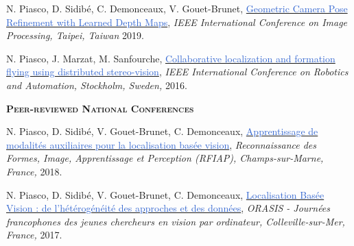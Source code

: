 \documentclass[]{friggeri-cv-cust}
\begin{document}
    {\footnotesize{N. Piasco, D. Sidibé,  C. Demonceaux, V. Gouet-Brunet, \href{}{\textcolor{highlight}{Geometric Camera Pose Refinement with Learned Depth Maps}},
\textit{IEEE International Conference on Image Processing, Taipei, Taiwan} 2019.}}

	{\footnotesize{N. Piasco, J. Marzat, M. Sanfourche, \href{http://julien.marzat.free.fr/Publications/2016\%20ICRA/2016_ICRA_Collaborative_localization_formation_flying_distributed_stereo-vision.pdf}{\textcolor{highlight}{Collaborative localization and formation ﬂying using distributed stereo-vision}},
\textit{IEEE International Conference on Robotics and Automation, Stockholm, Sweden,} 2016.}}	

	\vspace{0.5cm}
    \textsc{\textbf{Peer-reviewed National Conferences}}
    
    {\footnotesize{N. Piasco, D. Sidibé, V. Gouet-Brunet, C. Demonceaux, \href{https://rfiap2018.ign.fr/sites/default/files/ARTICLES/RFIAP_2018/RFIAP_2018_Piasco_Apprentissage.pdf}{\textcolor{highlight}{Apprentissage de modalités auxiliaires pour la localisation basée vision}},
\textit{Reconnaissance des Formes, Image, Apprentissage et Perception (RFIAP), Champs-sur-Marne, France,} 2018.}}

\footnotesize{N. Piasco, D. Sidibé, V. Gouet-Brunet, C. Demonceaux, \href{http://recherche.ign.fr/labos/matis/img/ic_pdf.gif}{\textcolor{highlight}{Localisation Basée Vision : de l’hétérogénéité des approches et des données}},
\textit{ORASIS - Journées francophones des jeunes chercheurs en vision par ordinateur, Colleville-sur-Mer, France,} 2017.}
    


% 
\end{document}
